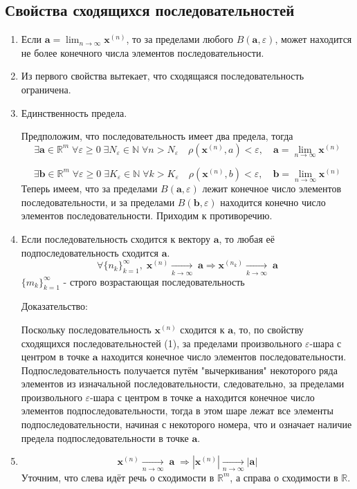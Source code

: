\subsection{Свойства сходящихся последовательностей}
\begin{enumerate} 
  \item 
  Если $\textbf {a} = \lim_{n\to\infty}{\textbf{x}^{(n)}}$, то за пределами любого $B(\textbf {a}, \varepsilon)$, может находится не более конечного числа элементов последовательности.
  \item
  Из первого свойства вытекает, что сходящаяся последовательность ограничена.
  \item
  Единственность предела.
  
  Предположим, что последовательность имеет два предела, тогда 
$$
\exists \textbf {a} \in \mathbb {R}^m \; \forall \varepsilon \geq 0 \; \exists N_{\varepsilon} \in \mathbb {N} \; \forall n > N_{\varepsilon} \quad \rho(\textbf{x}^{(n)}, a) < {\varepsilon}, \quad \textbf {a} = \lim_{n\to\infty}{\textbf{x}^{(n)}}
$$

$$
\exists \textbf {b} \in \mathbb {R}^m \; \forall \varepsilon \geq 0 \; \exists K_{\varepsilon} \in \mathbb {N} \; \forall k > K_{\varepsilon} \quad \rho(\textbf{x}^{(n)}, b) < {\varepsilon}, \quad \textbf {b} = \lim_{n\to\infty}{\textbf{x}^{(n)}}
$$
Теперь имеем, что за пределами $B(\textbf {a}, \varepsilon)$ лежит конечное число элементов последовательности, и за пределами $B(\textbf {b}, \varepsilon)$ находится конечно число элементов последовательности. Приходим к противоречию.
  \item
  Если последовательность сходится к вектору $\textbf {a}$, то любая её подпоследовательность сходится $\textbf {a}$.
  $$
  \forall \{n_k\}^{\infty}_{k=1}, \;\textbf {x}^{(n)} \underset{k \to \infty}{\longrightarrow} \; \textbf {a} \Rightarrow \textbf {x}^{(n_k)} \underset{k \to \infty}{\longrightarrow} \; \textbf {a}
  $$
  $\{m_k\}^{\infty}_{k=1}$ - строго возрастающая последовательность 
  
  Доказательство:
  
  Поскольку последовательность $\textbf {x}^{(n)}$ сходится к $\textbf {a}$, то, по свойству сходящихся последовательностей (1), за пределами произвольного $\varepsilon$-шара с центром в точке $\textbf {a}$ находится конечное число элементов последовательности. Подпоследовательность получается путём "вычеркивания" некоторого ряда элементов из изначальной последовательности, следовательно, за пределами произвольного $\varepsilon$-шара с центром в точке $\textbf {a}$ находится конечное число элементов подпоследовательности, тогда в этом шаре лежат все элементы подпоследовательности, начиная с некоторого номера, что и означает наличие предела подпоследовательности в точке $\textbf {a}$.
  \item
  $$
  \textbf {x}^{(n)} \underset{n \to \infty}{\longrightarrow} \; \textbf {a} \; \Rightarrow |\textbf {x}^{(n)}| \underset{n \to \infty}{\longrightarrow} |\textbf {a}|
  $$
  Уточним, что слева идёт речь о сходимости в $\mathbb {R}^m$, а справа о сходимости в $\mathbb {R}$.
  

\end{enumerate}
